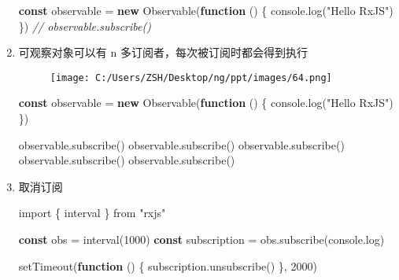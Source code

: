 \documentclass[
]{article}
\newenvironment{Shaded}{}{}
\newcommand{\BuiltInTok}[1]{#1}
\newcommand{\CommentTok}[1]{\textcolor[rgb]{0.38,0.63,0.69}{\textit{#1}}}
\newcommand{\DecValTok}[1]{\textcolor[rgb]{0.25,0.63,0.44}{#1}}
\newcommand{\FunctionTok}[1]{\textcolor[rgb]{0.02,0.16,0.49}{#1}}
\newcommand{\ImportTok}[1]{#1}
\newcommand{\KeywordTok}[1]{\textcolor[rgb]{0.00,0.44,0.13}{\textbf{#1}}}
\newcommand{\NormalTok}[1]{#1}
\newcommand{\OperatorTok}[1]{\textcolor[rgb]{0.40,0.40,0.40}{#1}}
\newcommand{\PreprocessorTok}[1]{\textcolor[rgb]{0.74,0.48,0.00}{#1}}
\newcommand{\StringTok}[1]{\textcolor[rgb]{0.25,0.44,0.63}{#1}}
\begin{document}
\begin{enumerate}
\begin{Shaded}
\begin{Highlighting}[]
\KeywordTok{const}\NormalTok{ observable }\OperatorTok{=} \KeywordTok{new} \FunctionTok{Observable}\NormalTok{(}\KeywordTok{function}\NormalTok{ () \{}
  \BuiltInTok{console}\OperatorTok{.}\FunctionTok{log}\NormalTok{(}\StringTok{"Hello RxJS"}\NormalTok{)}
\NormalTok{\})}
\CommentTok{// observable.subscribe()}
\end{Highlighting}
\end{Shaded}
\item
  可观察对象可以有 n 多订阅者，每次被订阅时都会得到执行

  \begin{figure}
  \centering
  \texttt{[image: C:/Users/ZSH/Desktop/ng/ppt/images/64.png]}
  \caption{}
  \end{figure}

\begin{Shaded}
\begin{Highlighting}[]
\KeywordTok{const}\NormalTok{ observable }\OperatorTok{=} \KeywordTok{new} \FunctionTok{Observable}\NormalTok{(}\KeywordTok{function}\NormalTok{ () \{}
  \BuiltInTok{console}\OperatorTok{.}\FunctionTok{log}\NormalTok{(}\StringTok{"Hello RxJS"}\NormalTok{)}
\NormalTok{\})}

\NormalTok{observable}\OperatorTok{.}\FunctionTok{subscribe}\NormalTok{()}
\NormalTok{observable}\OperatorTok{.}\FunctionTok{subscribe}\NormalTok{()}
\NormalTok{observable}\OperatorTok{.}\FunctionTok{subscribe}\NormalTok{()}
\NormalTok{observable}\OperatorTok{.}\FunctionTok{subscribe}\NormalTok{()}
\NormalTok{observable}\OperatorTok{.}\FunctionTok{subscribe}\NormalTok{()}
\end{Highlighting}
\end{Shaded}
\item
  取消订阅

\begin{Shaded}
\begin{Highlighting}[]
\ImportTok{import}\NormalTok{ \{ interval \} }\ImportTok{from} \StringTok{"rxjs"}

\KeywordTok{const}\NormalTok{ obs }\OperatorTok{=} \FunctionTok{interval}\NormalTok{(}\DecValTok{1000}\NormalTok{)}
\KeywordTok{const}\NormalTok{ subscription }\OperatorTok{=}\NormalTok{ obs}\OperatorTok{.}\FunctionTok{subscribe}\NormalTok{(}\BuiltInTok{console}\OperatorTok{.}\FunctionTok{log}\NormalTok{)}

\PreprocessorTok{setTimeout}\NormalTok{(}\KeywordTok{function}\NormalTok{ () \{}
\NormalTok{  subscription}\OperatorTok{.}\FunctionTok{unsubscribe}\NormalTok{()}
\NormalTok{\}}\OperatorTok{,} \DecValTok{2000}\NormalTok{)}
\end{Highlighting}
\end{Shaded}
\end{enumerate}
\end{document}
